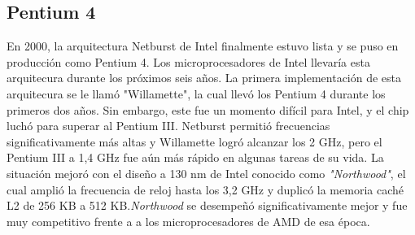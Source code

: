 \subsection{Pentium 4}
En 2000, la arquitectura Netburst de Intel finalmente estuvo lista y se puso en producción como Pentium 4. Los microprocesadores de Intel llevaría esta 
arquitecura durante los próximos seis años. La primera implementación de esta arquitecura se le llamó "Willamette", la cual llevó los Pentium 4 
durante los primeros dos años. Sin embargo, este fue un momento difícil para Intel, y el chip luchó para superar al Pentium III. Netburst permitió 
frecuencias significativamente más altas y Willamette logró alcanzar los 2 GHz, pero el Pentium III a 1,4 GHz fue aún más rápido en algunas tareas
de su vida. La situación mejoró con el diseño a 130 nm de Intel conocido como \emph{"Northwood"}, el cual  amplió la frecuencia de reloj hasta los 3,2 GHz y 
duplicó la memoria caché L2 de 256 KB a 512 KB.\emph{Northwood} se desempeñó significativamente mejor y fue muy competitivo frente a a los microprocesadores 
de AMD de esa época.

